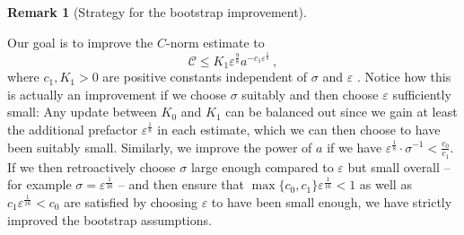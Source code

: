 \documentclass[11pt,leqno,textwidth=10cm]{amsart}
\numberwithin{equation}{section}
\theoremstyle{definition}
\newtheorem{remark}[definition]{Remark}
\theoremstyle{plain}
\newcommand{\1}{\mathbbm{1}}
\newcommand{\E}{\mathcal{E}}
\newcommand{\Ric}{\text{\normalfont{Ric}}}
\renewcommand{\epsilon}{\varepsilon}
\newcommand{\todo}[1]{\textcolor{red}{#1}}
\newcommand{\delete}[1]{}
\begin{document}
\begin{remark}[Strategy for the bootstrap improvement]\label{rem:bs-strategy}

Our goal is to improve the $C$-norm estimate to
\begin{equation*}
\mathcal{C}\leq K_1\epsilon^\frac98a^{-c_1\epsilon^\frac18}\,,
\end{equation*}
where $c_1,K_1>0$ are positive constants independent of $\sigma$ and $\epsilon$ \delete{and to improve the energy estimates similarly (as listed in \eqref{eq:en-imp-main-SF}-\eqref{eq:en-imp-main-N})}. Notice how this is actually an improvement if we choose $\sigma$ suitably and then choose $\epsilon$ sufficiently small: Any update between $K_0$ and $K_1$ can be balanced out since we gain at least the additional prefactor $\epsilon^\frac18$ in each estimate, which we can then choose to have been suitably small. Similarly, we improve the power of $a$ if we have $\epsilon^{\frac18}\cdot\sigma^{-1}<\frac{c_0}{c_1}$. If we then retroactively choose $\sigma$ large enough compared to $\epsilon$ but small overall -- for example $\sigma=\epsilon^\frac{1}{16}$ -- and then ensure that $\max\{c_0,c_1\}\epsilon^\frac1{16}<1$ as well as $c_1\epsilon^\frac1{16}<c_0$ are satisfied by choosing $\epsilon$ to have been small enough, we have strictly improved the bootstrap assumptions.
\end{remark}
\end{document}

